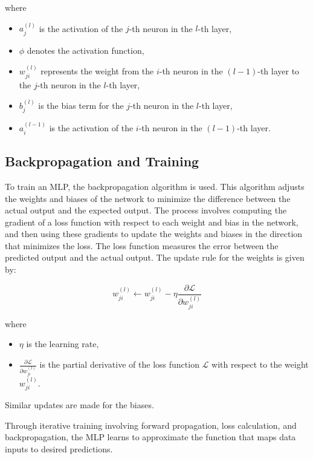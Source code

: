where
\begin{itemize}
	\item $a^{(l)}_j$ is the activation of the $j$-th neuron in the $l$-th layer,
	\item $\phi$ denotes the activation function,
	\item $w^{(l)}_{ji}$ represents the weight from the $i$-th neuron in the $(l-1)$-th layer to the $j$-th neuron in the $l$-th layer,
	\item $b^{(l)}_j$ is the bias term for the $j$-th neuron in the $l$-th layer,
	\item $a^{(l-1)}_i$ is the activation of the $i$-th neuron in the $(l-1)$-th layer.
\end{itemize}

\subsection{Backpropagation and Training}

To train an MLP, the backpropagation algorithm is used.
This algorithm adjusts the weights and biases of the network to minimize the difference between the actual output and the expected output.
The process involves computing the gradient of a loss function with respect to each weight and bias in the network, and then using these gradients to update the weights and biases in the direction that minimizes the loss.
The loss function measures the error between the predicted output and the actual output. The update rule for the weights is given by:

\begin{equation}
	w^{(l)}_{ji} \leftarrow w^{(l)}_{ji} - \eta \frac{\partial \mathcal{L}}{\partial w^{(l)}_{ji}}
\end{equation}

where
\begin{itemize}
	\item $\eta$ is the learning rate, %
	\item $\frac{\partial \mathcal{L}}{\partial w^{(l)}_{ji}}$ is the partial derivative of the loss function $\mathcal{L}$ with respect to the weight $w^{(l)}_{ji}$.
\end{itemize}
Similar updates are made for the biases.

Through iterative training involving forward propagation, loss calculation, and backpropagation, the MLP learns to approximate the function that maps data inputs to desired predictions.

